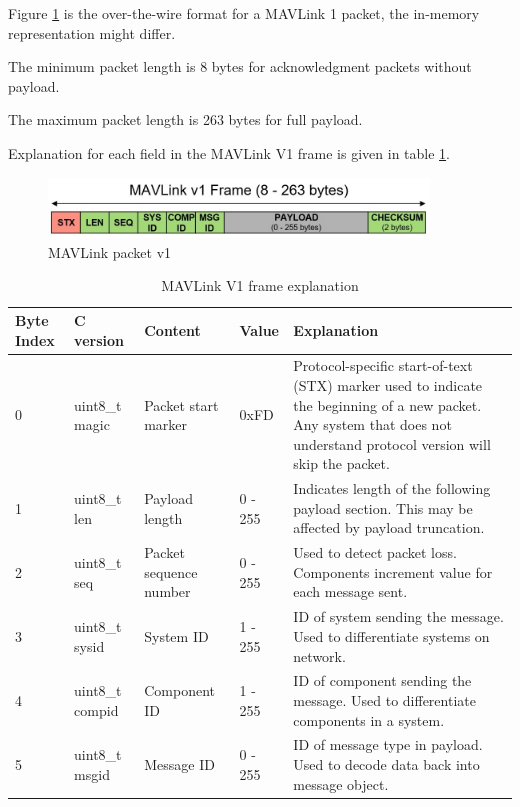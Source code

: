 \documentclass[\main/main.tex]{subfiles}
\begin{document}
Figure \ref{fig:packet_mavlink_v1} is the over-the-wire format for a MAVLink 1 packet, the in-memory representation might differ.

The minimum packet length is 8 bytes for acknowledgment packets without payload.

The maximum packet length is 263 bytes for full payload.

Explanation for each field in the MAVLink V1 frame is given in table \ref{tab:mavlink_v1_frame_explanation}.
\begin{figure}[H]
    \begin{center}
        \includegraphics[width=0.9\textwidth]{packet_mavlink_v1.jpg}
    \end{center}
    \caption{MAVLink packet v1}
    \label{fig:packet_mavlink_v1}
\end{figure}

\begin{table}[H]
    \begin{tabular}{ | p{1.3cm} | p{1.8cm} | p{2cm} | l | p{9cm} |}
    \hline
    Byte Index & C version & Content & Value & Explanation \\\hline
    0 & uint8\_t magic & Packet start marker	& 0xFD & Protocol-specific start-of-text (STX) marker used to indicate the beginning of a new packet. Any system that does not understand protocol version will skip the packet. \\\hline
    1 & uint8\_t len & Payload length & 0 - 255	& Indicates length of the following payload section. This may be affected by payload truncation. \\\hline
    2 & uint8\_t seq	& Packet sequence number & 0 - 255 & Used to detect packet loss. Components increment value for each message sent. \\\hline
    3 & uint8\_t sysid & System ID & 1 - 255 & ID of system  sending the message. Used to differentiate systems on network.\\\hline
    4 & uint8\_t compid	& Component ID & 1 - 255 & ID of component sending the message. Used to differentiate components in a system. \\\hline
    5 & uint8\_t msgid & Message ID & 0 - 255 & ID of message type in payload. Used to decode data back into message object.\\\hline
    \end{tabular}
    \caption{MAVLink V1 frame explanation}
    \label{tab:mavlink_v1_frame_explanation}
\end{table}
\end{document}
